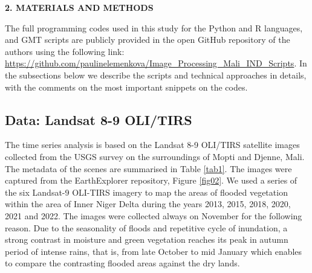 \documentclass[12pt,a4paper,oneside]{article}
\def \newsection{\vspace{12pt}\textbf}
\def \newpar{\vspace{6pt}}
\begin{document}
\newsection {2. MATERIALS AND METHODS}

The full programming codes used in this study for the Python and R languages, and GMT scripts are publicly provided in the open GitHub repository of the authors using the following link: \href{https://github.com/paulinelemenkova/Image_Processing_Mali_IND_Scripts}{https://github.com/paulinelemenkova/Image\_Processing\_Mali\_IND\_Scripts}. In the subsections below we describe the scripts and technical approaches in details, with the comments on the most important snippets on the codes.

\subsection*{Data: Landsat 8-9 OLI/TIRS}

\newpar The time series analysis is based on the Landsat 8-9 OLI/TIRS satellite images collected from the USGS survey \citep{Landsat9} on the surroundings of Mopti and Djenne, Mali. The metadata of the scenes are summarised in Table \ref{tab1}. The images were captured from the EarthExplorer repository, Figure \ref{fig02}. We used a series of the six Landsat-9 OLI-TIRS imagery to map the areas of flooded vegetation within the area of Inner Niger Delta during the years 2013, 2015, 2018, 2020, 2021 and 2022. The images were collected always on November for the following reason. Due to the seasonality of floods and repetitive cycle of inundation, a strong contrast in moisture and green vegetation reaches its peak in autumn period of intense rains, that is, from late October to mid January which enables to compare the contrasting flooded areas against the dry lands. 
\end{document}
